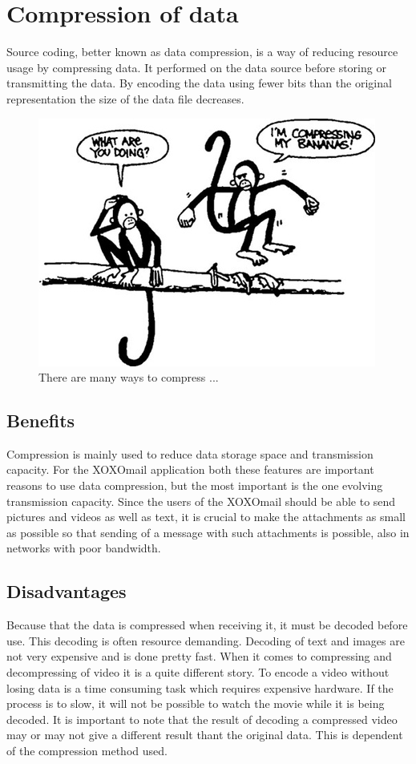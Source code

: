 
\section{Compression of data}

Source coding, better known as data compression, is a way of reducing resource usage by compressing data. It performed on the data source before storing or transmitting the data. By encoding the data using fewer bits than the original representation the size of the data file decreases.

\begin{figure}[h!]
\begin{center}
\includegraphics[scale=0.5]{compressionmonkeys}
\caption{There are many ways to compress ... \cite{bib:compressionImage}}
\end{center}
\end{figure}

\subsection{Benefits}
Compression is mainly used to reduce data storage space and transmission capacity. For the XOXOmail application both these features are important reasons to use data compression, but the most important is the one evolving transmission capacity. Since the users of the XOXOmail should be able to send pictures and videos as well as text, it is crucial to make the attachments as small as possible so that sending of a message with such attachments is possible, also in networks with poor bandwidth.

\subsection{Disadvantages}
Because that the data is compressed when receiving it, it must be decoded before use. This decoding is often resource demanding. Decoding of text and images are not very expensive and is done pretty fast.  When it comes to compressing and decompressing of video it is a quite different story. To encode a video without losing data is a time consuming task which requires expensive hardware. If the process is to slow, it will not be possible to watch the movie while it is being decoded. It is important to note that the result of decoding a compressed video may or may not give a different result thant the original data. This is dependent of the compression method used.

